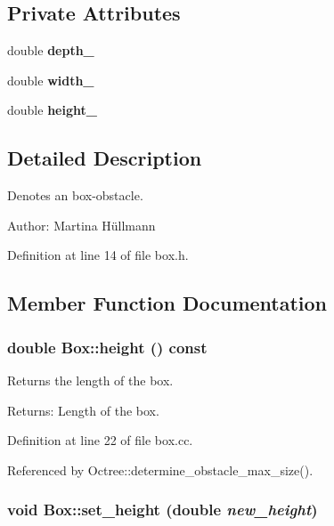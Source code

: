 \subsection*{Private Attributes}
\begin{CompactItemize}
\item 
\hypertarget{class_box_4a10d30962d726db33010380ff817ba7}{
double \textbf{depth\_\-}}
\label{class_box_4a10d30962d726db33010380ff817ba7}

\item 
\hypertarget{class_box_ae8acc7abfcd89d46fcb01562dfc53b0}{
double \textbf{width\_\-}}
\label{class_box_ae8acc7abfcd89d46fcb01562dfc53b0}

\item 
\hypertarget{class_box_9b372de7550463c8bad45d61a23bfe5a}{
double \textbf{height\_\-}}
\label{class_box_9b372de7550463c8bad45d61a23bfe5a}

\end{CompactItemize}


\subsection{Detailed Description}
Denotes an box-obstacle. 

\begin{Desc}
\item[Author:]Martina Hüllmann \end{Desc}


Definition at line 14 of file box.h.

\subsection{Member Function Documentation}
\hypertarget{class_box_8b436da1c22ee2335d692fe44c53ce90}{
\subsubsection[height]{\setlength{\rightskip}{0pt plus 5cm}double Box::height () const}}
\label{class_box_8b436da1c22ee2335d692fe44c53ce90}


Returns the length of the box. \begin{Desc}
\item[Returns:]Length of the box. \end{Desc}


Definition at line 22 of file box.cc.

Referenced by Octree::determine\_\-obstacle\_\-max\_\-size().\hypertarget{class_box_98acafd52d9a5596a6f6d1b87918fd2d}{
\subsubsection[set\_\-height]{\setlength{\rightskip}{0pt plus 5cm}void Box::set\_\-height (double {\em new\_\-height})}}
\label{class_box_98acafd52d9a5596a6f6d1b87918fd2d}



